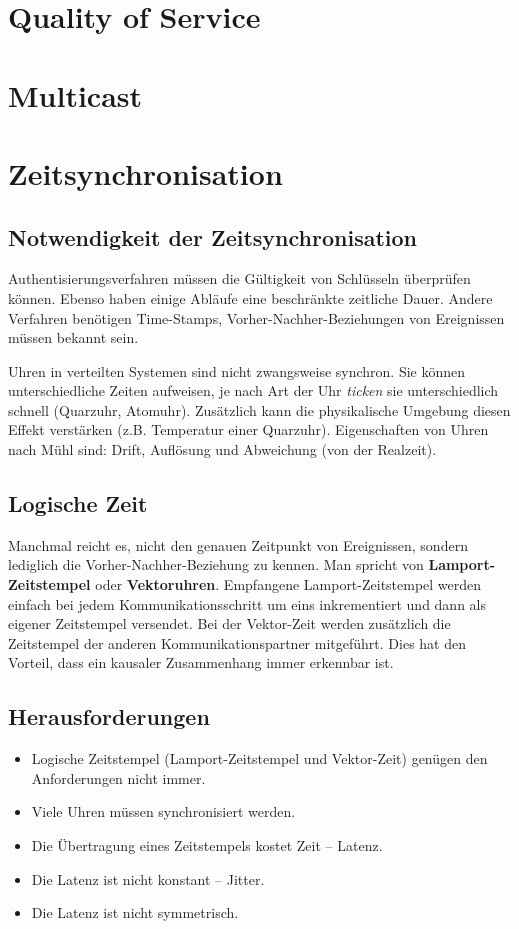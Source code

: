 \documentclass{article} %
\begin{document}
\section{Quality of Service}
\label{sec:qos}

\section{Multicast}
\label{sec:muliticast}

\section{Zeitsynchronisation}


\subsection{Notwendigkeit der Zeitsynchronisation}
Authentisierungsverfahren müssen die Gültigkeit von Schlüsseln überprüfen können.
Ebenso haben einige Abläufe eine beschränkte zeitliche Dauer.
Andere Verfahren benötigen Time-Stamps, Vorher-Nachher-Beziehungen von Ereignissen müssen bekannt sein.

Uhren in verteilten Systemen sind nicht zwangsweise synchron.
Sie können unterschiedliche Zeiten aufweisen, je nach Art der Uhr \emph{ticken} sie unterschiedlich schnell (Quarzuhr, Atomuhr).
Zusätzlich kann die physikalische Umgebung diesen Effekt verstärken (z.B. Temperatur einer Quarzuhr).
Eigenschaften von Uhren nach Mühl sind: Drift, Auflösung und Abweichung (von der Realzeit).

\subsection{Logische Zeit}
Manchmal reicht es, nicht den genauen Zeitpunkt von Ereignissen, sondern lediglich die Vorher-Nachher-Beziehung zu kennen.
Man spricht von \textbf{Lamport-Zeitstempel} oder \textbf{Vektoruhren}.
Empfangene Lamport-Zeitstempel werden einfach bei jedem Kommunikationsschritt um eins inkrementiert und dann als eigener Zeitstempel versendet.
Bei der Vektor-Zeit werden zusätzlich die Zeitstempel der anderen Kommunikationspartner mitgeführt.
Dies hat den Vorteil, dass ein kausaler Zusammenhang immer erkennbar ist.

\subsection{Herausforderungen}
\begin{itemize}
	\item Logische Zeitstempel (Lamport-Zeitstempel und Vektor-Zeit) genügen den Anforderungen nicht immer.
	\item Viele Uhren müssen synchronisiert werden.
	\item Die Übertragung eines Zeitstempels kostet Zeit – Latenz.
	\item Die Latenz ist nicht konstant – Jitter.
	\item Die Latenz ist nicht symmetrisch.
\end{itemize}
\end{document}
